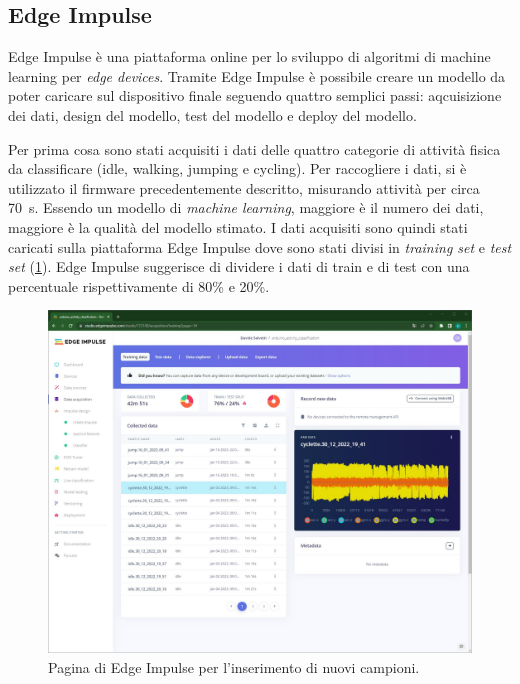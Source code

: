 \subsection{Edge Impulse}
Edge Impulse è una piattaforma online per lo sviluppo di algoritmi di machine learning per \textit{edge devices}. Tramite Edge Impulse è possibile creare un modello da poter caricare sul dispositivo finale seguendo quattro semplici passi: aqcuisizione dei dati, design del modello, test del modello e deploy del modello. 

Per prima cosa sono stati acquisiti i dati delle quattro categorie di attività fisica da classificare (idle, walking, jumping e cycling). Per raccogliere i dati, si è utilizzato il firmware precedentemente descritto, misurando attività per circa \SI{70}{\second}. Essendo un modello di \textit{machine learning}, maggiore è il numero dei dati, maggiore è la qualità del modello stimato. I dati acquisiti sono  quindi stati caricati sulla piattaforma Edge Impulse dove sono stati divisi in \textit{training set} e \textit{test set} (\Fig\ref{fig:acquisizione_dati}). Edge Impulse suggerisce di dividere i dati di train e di test con una percentuale rispettivamente di 80\% e 20\%.
\begin{figure}[h!]
	\centering
	\includegraphics[width=0.5\linewidth]{./ImageFiles/data_acquisition.jpg}
	\caption{Pagina di Edge Impulse per l'inserimento di nuovi campioni.}
	\label{fig:acquisizione_dati}
\end{figure}

